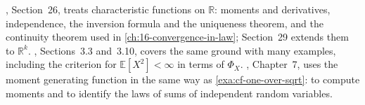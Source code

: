 \furtherreading
\textcite{billingsley}, Section~26, treats characteristic functions on $\mathbb R$: moments and
derivatives, independence, the inversion formula and the uniqueness theorem, and the continuity
theorem used in \cref{ch:16-convergence-in-law}; Section~29 extends them to $\mathbb R^k$.
\textcite{durrett}, Sections~3.3 and~3.10, covers the same ground with many examples, including
the criterion for $\mathbb E[X^2]<\infty$ in terms of $\Phi_X$. \textcite{ross-5}, Chapter~7,
uses the moment generating function in the same way as \cref{exa:cf-one-over-sqrt}: to compute
moments and to identify the laws of sums of independent random variables.
